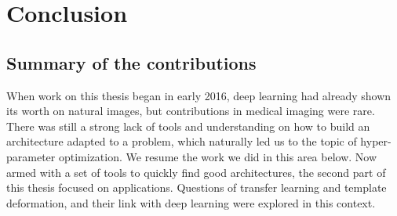 \chapter{Conclusion}
\label{chap:conclusion}

\section{Summary of the contributions}

When work on this thesis began in early 2016, deep learning had already shown its worth on natural images, but contributions in medical imaging were rare. There was still a strong lack of tools and understanding on how to build an architecture adapted to a problem, which naturally led us to the topic of hyper-parameter optimization. We resume the work we did in this area below. Now armed with a set of tools to quickly find good architectures, the second part of this thesis focused on applications. Questions of transfer learning and template deformation, and their link with deep learning were explored in this context.

